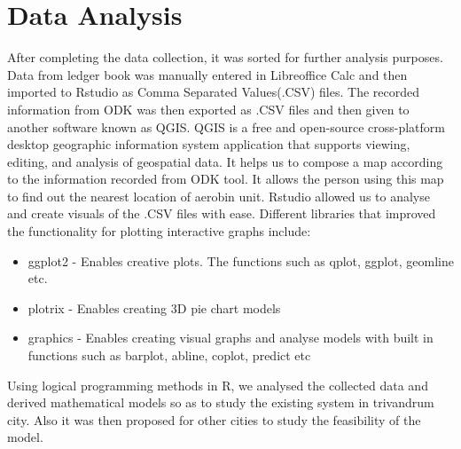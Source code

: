 \documentclass[12pt,a4paper]{  report}
\begin{document}
\chapter{\textbf{Data Analysis}}
\begin{justify}
	After completing the data collection, it was sorted for further analysis purposes. Data from ledger book was manually entered in Libreoffice Calc and then imported to Rstudio as Comma Separated Values(.CSV) files. The recorded information from ODK was then exported as .CSV files and then given to another software known as QGIS. QGIS is a free and open-source cross-platform desktop geographic information system application that supports viewing, editing, and analysis of geospatial data. It helps us to compose a map according to the information recorded from ODK tool. It allows the person using this map to find out the nearest location of aerobin unit.
	Rstudio allowed us to analyse and create visuals of the .CSV files with ease. Different libraries that improved the functionality for plotting interactive graphs include: 
\end{justify}
	
\begin{itemize}
\item ggplot2 - Enables creative plots. The functions such as qplot, ggplot, geomline etc.
\item plotrix - Enables creating 3D pie chart models
\item graphics - Enables creating visual graphs and analyse models with built in functions such as barplot, abline, coplot, predict etc
\end{itemize}

\begin{justify}
	Using logical programming methods in R, we analysed the collected data and derived mathematical models so as to study the existing system in trivandrum city. Also it was then proposed for other cities to study the feasibility of the model.
\end{justify}	
\end{document}
